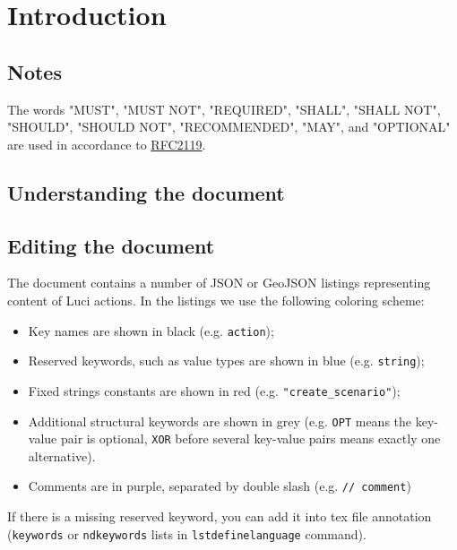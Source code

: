 \section{Introduction}

\subsection{Notes}
The words "MUST", "MUST NOT", "REQUIRED", "SHALL", "SHALL NOT", "SHOULD", "SHOULD NOT", "RECOMMENDED", "MAY", and "OPTIONAL" are used in accordance to \href{https://www.ietf.org/rfc/rfc2119.txt}{RFC2119}.

\subsection{Understanding the document}

\subsection{Editing the document}
\label{sec:editing}

The document contains a number of JSON or GeoJSON listings representing content of \ac{Luci} actions.
In the listings we use the following coloring scheme:
%
\begin{itemize}
\item Key names are shown in black (e.g. \texttt{action});
\item Reserved keywords, such as value types are shown in blue (e.g. \texttt{\color{blue}string});
\item Fixed strings constants are shown in red (e.g. \texttt{\color{red}"create\_scenario"});
\item Additional structural keywords are shown in grey
(e.g. \texttt{\color{darkgray}OPT} means the key-value pair is optional, \texttt{\color{darkgray}XOR} before several key-value pairs means exactly one alternative).
\item Comments are in purple, separated by double slash (e.g. \texttt{\color{purple}// comment})
\end{itemize}
%
If there is a missing reserved keyword, you can add it into tex file annotation (\texttt{keywords} or \texttt{ndkeywords} lists in \texttt{lstdefinelanguage} command).

\clearpage
